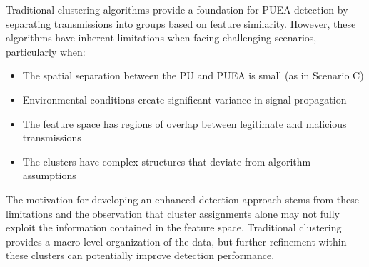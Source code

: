 Traditional clustering algorithms provide a foundation for PUEA detection by separating transmissions into groups based on feature similarity. However, these algorithms have inherent limitations when facing challenging scenarios, particularly when:

\begin{itemize}
    \item The spatial separation between the PU and PUEA is small (as in Scenario C)
    \item Environmental conditions create significant variance in signal propagation
    \item The feature space has regions of overlap between legitimate and malicious transmissions
    \item The clusters have complex structures that deviate from algorithm assumptions
\end{itemize}

The motivation for developing an enhanced detection approach stems from these limitations and the observation that cluster assignments alone may not fully exploit the information contained in the feature space. Traditional clustering provides a macro-level organization of the data, but further refinement within these clusters can potentially improve detection performance.

